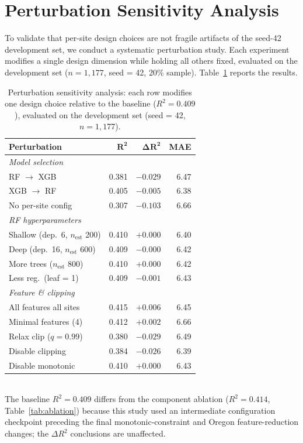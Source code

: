 \documentclass[toxins,article,submit,moreauthors]{Definitions/mdpi}
\begin{document}
\section{Perturbation Sensitivity Analysis}
\label{app:perturbation-sensitivity}

To validate that per-site design choices are not fragile artifacts of the seed-42 development set, we conduct a systematic perturbation study. Each experiment modifies a single design dimension while holding all others fixed, evaluated on the development set ($n = 1{,}177$, seed = 42, 20\% sample). Table~\ref{tab:perturbation} reports the results.

\begin{table}[H]
\caption{Perturbation sensitivity analysis: each row modifies one design choice relative to the baseline ($R^2 = 0.409$), evaluated on the development set (seed = 42, $n = 1{,}177$).}
\label{tab:perturbation}
\centering\footnotesize
\begin{tabularx}{\linewidth}{Xrrr}
\toprule
\textbf{Perturbation} & $\boldsymbol{R^2}$ & $\boldsymbol{\Delta R^2}$ & \textbf{MAE} \\
\midrule
\multicolumn{4}{l}{\textit{Model selection}} \\
\quad RF $\rightarrow$ XGB & 0.381 & $-0.029$ & 6.47 \\
\quad XGB $\rightarrow$ RF & 0.405 & $-0.005$ & 6.38 \\
\quad No per-site config   & 0.307 & $-0.103$ & 6.66 \\
\midrule
\multicolumn{4}{l}{\textit{RF hyperparameters}} \\
\quad Shallow (dep.\ 6, $n_{\text{est}}$ 200) & 0.410 & $+0.000$ & 6.40 \\
\quad Deep (dep.\ 16, $n_{\text{est}}$ 600)   & 0.409 & $-0.000$ & 6.42 \\
\quad More trees ($n_{\text{est}}$ 800)        & 0.410 & $+0.000$ & 6.42 \\
\quad Less reg.\ (leaf = 1)                    & 0.409 & $-0.001$ & 6.43 \\
\midrule
\multicolumn{4}{l}{\textit{Feature \& clipping}} \\
\quad All features all sites    & 0.415 & $+0.006$ & 6.45 \\
\quad Minimal features (4)      & 0.412 & $+0.002$ & 6.66 \\
\quad Relax clip ($q = 0.99$)   & 0.380 & $-0.029$ & 6.49 \\
\quad Disable clipping          & 0.384 & $-0.026$ & 6.39 \\
\quad Disable monotonic         & 0.410 & $+0.000$ & 6.43 \\
\bottomrule
\end{tabularx}
\vspace{0.3em}\\
\footnotesize{The baseline $R^2 = 0.409$ differs from the component ablation ($R^2 = 0.414$, Table~\ref{tab:ablation}) because this study used an intermediate configuration checkpoint preceding the final monotonic-constraint and Oregon feature-reduction changes; the $\Delta R^2$ conclusions are unaffected.}
\end{table}
\end{document}
